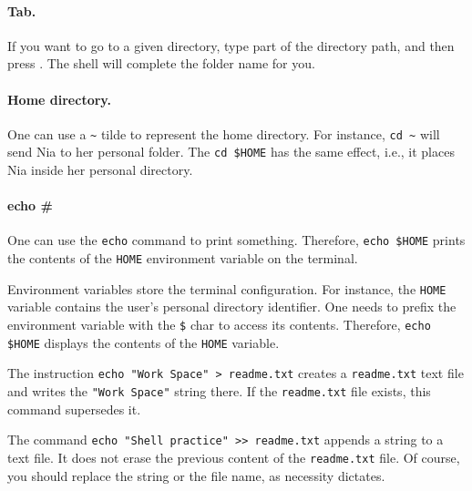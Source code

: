 \documentclass[a4paper,12pt]{book}
\begin{document}
\paragraph{Tab.} If you want to go
to a given directory, type part of the directory
path, and then press .
The shell will complete the folder name for you.

\paragraph{Home directory.} One
can use a \verb|~| tilde to represent
the home directory. For instance,
\verb|cd ~| will send Nia to her
personal folder. The \verb|cd $HOME| has
the same effect, i.e., it places Nia inside
her personal directory.

\paragraph{echo \#} One can use the
\verb|echo| command to print something.
Therefore, \verb|echo $HOME| prints
the contents of the \verb|HOME|
environment variable on the terminal.

Environment variables store
the terminal configuration. For instance,
the \verb|HOME| variable contains
the user's personal directory identifier.
One needs to prefix the environment
variable with the \verb|$| char
to access its contents. Therefore,
\verb|echo $HOME| displays the
contents of the \verb|HOME| variable.

The instruction \verb|echo "Work Space" > readme.txt|
creates a \verb|readme.txt| text file and
writes the \verb|"Work Space"| string there.
If the \verb|readme.txt| file exists,
this command supersedes it.

The command \verb|echo "Shell practice" >> readme.txt|
appends a string to a text file. It does
not erase the previous content of
the \verb|readme.txt| file. Of course,
you should replace the string or the
file name, as necessity dictates.
\end{document}
